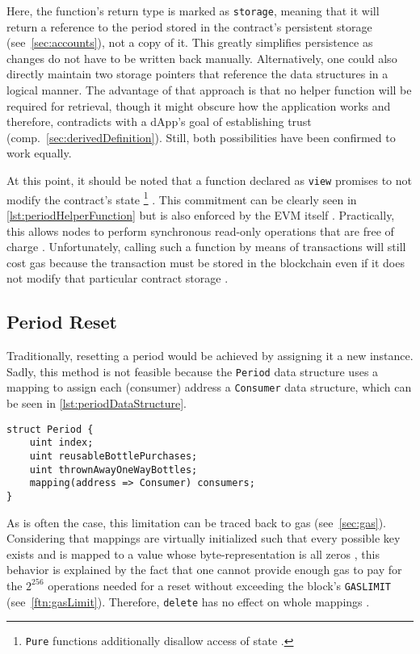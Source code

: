 Here, the function's return type is marked as \texttt{storage}, meaning that it will return a reference to the period stored in the contract's persistent storage (see~\ref{sec:accounts}), not a copy of it. This greatly simplifies persistence as changes do not have to be written back manually. Alternatively, one could also directly maintain two storage pointers that reference the data structures in a logical manner. The advantage of that approach is that no helper function will be required for retrieval, though it might obscure how the application works and therefore, contradicts with a \ac{dApp}'s goal of establishing trust (comp.~\ref{sec:derivedDefinition}). Still, both possibilities have been confirmed to work equally.
 
 At this point, it should be noted that a function declared as \texttt{view} promises to not modify the contract's state \footnote{\texttt{Pure} functions additionally disallow access of state \cite[p.~82]{solidityDocs}.} \cite[p.~82]{solidityDocs}. This commitment can be clearly seen in \autoref{lst:periodHelperFunction} but is also enforced by the \ac{EVM} itself \cite[p.~83]{solidityDocs}. Practically, this allows nodes to perform synchronous read-only operations that are free of charge \cite{transactionCall}. Unfortunately, calling such a function by means of transactions will still cost gas because the transaction must be stored in the blockchain even if it does not modify that particular contract storage \cite{constantGas}. 
 
\subsection{Period Reset}
Traditionally, resetting a period would be achieved by assigning it a new instance. Sadly, this method is not feasible because the \texttt{Period} data structure uses a mapping to assign each (consumer) address a \texttt{Consumer} data structure, which can be seen in \autoref{lst:periodDataStructure}. 

\begin{lstlisting}[language=Solidity, caption=Period data structure, label=lst:periodDataStructure]
struct Period {
	uint index;
	uint reusableBottlePurchases;
	uint thrownAwayOneWayBottles;
	mapping(address => Consumer) consumers;
}
\end{lstlisting}

As is often the case, this limitation can be traced back to gas (see~\ref{sec:gas}). Considering that mappings are virtually initialized such that every possible key exists and is mapped to a value whose byte-representation is all zeros \cite[p.~62]{solidityDocs}, this behavior is explained by the fact that one cannot provide enough gas to pay for the $2^{256}$ operations needed for a reset without exceeding the block's \texttt{GASLIMIT} (see~\autoref{ftn:gasLimit}). Therefore, \texttt{delete} has no effect on whole mappings \cite[p.~63]{solidityDocs}.

